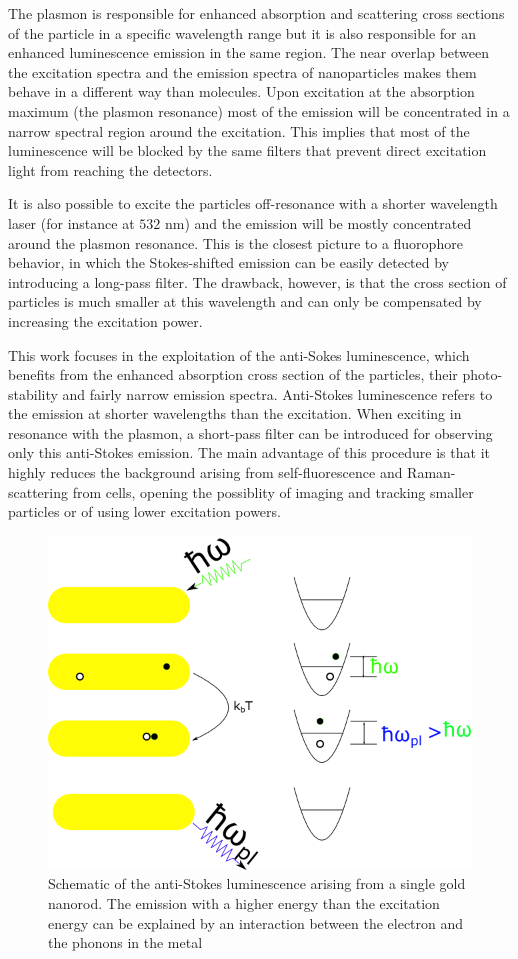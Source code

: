 \documentclass[journal=nalefd,manuscript=letter]{achemso}
\newcommand{\nm}{\ensuremath{\,\textrm{nm}}}
\begin{document}
The plasmon is responsible for enhanced absorption and scattering cross sections
of the particle in a specific wavelength range but it is also responsible for an
enhanced luminescence emission in the same region. The near overlap between the
excitation spectra and the emission spectra of nanoparticles makes them behave
in a different way than molecules. Upon excitation at the absorption maximum
(the plasmon resonance) most of the emission will be concentrated in a narrow
spectral region around the excitation. This implies that most of the
luminescence will be blocked by the same filters that prevent direct excitation
light from reaching the detectors.

It is also possible to excite the particles off-resonance with a
shorter wavelength laser (for instance at $532\,\nm$) and the emission will be
mostly concentrated around the plasmon resonance. This is the closest picture
to a fluorophore behavior, in which the Stokes-shifted emission can be easily
detected by introducing a long-pass filter. The drawback, however, is that the
cross section of particles is much smaller at this wavelength and can only
be compensated by increasing the excitation power. 

This work focuses in the exploitation of the anti-Sokes luminescence, which
benefits from the enhanced absorption cross section of the particles, their
photo-stability and fairly narrow emission spectra. Anti-Stokes luminescence
refers to the emission at shorter wavelengths than the excitation. When exciting
in resonance with the plasmon, a short-pass filter can be introduced for
observing only this anti-Stokes emission. The main advantage of this procedure
is that it highly reduces the background arising from self-fluorescence
and Raman-scattering from cells, opening the possiblity of imaging and tracking
smaller particles or of using lower excitation powers.

\begin{figure}[htp]
\centering
	\includegraphics[width=0.4\linewidth]{luminescence_all_AS.png}
	\caption{Schematic of the anti-Stokes luminescence arising from a single gold
	nanorod. The emission with a higher energy than the excitation energy can be
	explained by an interaction between the electron and the phonons in the metal}
	\label{fig:anti-Stokes-process}
\end{figure}
\end{document}
